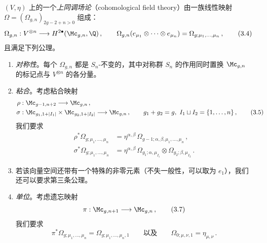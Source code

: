 \begin{definition}[3.1]
$(V,\eta)$ 上的一个\emph{上同调场论}（cohomological field theory）由一族线性映射 $\Omega=(\Omega_{g,n})_{2g-2+n>0}$ 组成：
\begin{equation}
  \Omega_{g,n}:V^{\otimes n}\longrightarrow H^{2\bullet}(\Mc_{g,n},\Q)\,,\qquad
  \Omega_{g,n}(e_{\mu_{1}}\otimes\cdots\otimes e_{\mu_{n}})=\Omega_{g;\mu_{1},\dots,\mu_{n}}\,,
  \tag{3.4}
\end{equation}
且满足下列公理。
\begin{enumerate}[label=\roman*)]
  \item \emph{对称性}。每个 $\Omega_{g,n}$ 都是 $S_{n}$-不变的，其中对称群 $S_{n}$ 的作用同时置换 $\Mc_{g,n}$ 的标记点与 $V^{\otimes n}$ 的各分量。
  \item \emph{粘合}。考虑粘合映射
  \begin{align}
    \rho &:\Mc_{g-1,n+2}\longrightarrow\Mc_{g,n}\,, \nonumber\\
    \sigma &:\Mc_{g_{1},1+|I_{1}|}\times\Mc_{g_{2},1+|I_{2}|}\longrightarrow\Mc_{g,n}\,,\qquad g_{1}+g_{2}=g,\ I_{1}\sqcup I_{2}=\{1,\dots,n\}\,,
    \tag{3.5}
  \end{align}
  我们要求
  \begin{align}
    \rho^{*}\Omega_{g;\mu_{1},\dots,\mu_{n}} &= \eta^{\alpha,\beta}\,\Omega_{g-1;\alpha,\beta,\mu_{1},\dots,\mu_{n}}\,, \nonumber\\
    \sigma^{*}\Omega_{g;\mu_{1},\dots,\mu_{n}} &= \eta^{\alpha,\beta}\,\Omega_{g_{1};\alpha,\mu_{I_{1}}}\otimes\Omega_{g_{2};\beta,\mu_{I_{2}}}\,.
    \tag{3.6}
  \end{align}
  \item[] 若该向量空间还带有一个特殊的非零元素（不失一般性，可以取为 $e_{1}$），我们还可以要求第三条公理。
  \item \emph{单位}。考虑遗忘映射
  \begin{equation}
    \pi:\Mc_{g,n+1}\longrightarrow\Mc_{g,n}\,,
    \tag{3.7}
  \end{equation}
  我们要求
  \begin{equation}
    \pi^{*}\Omega_{g;\mu_{1},\dots,\mu_{n}}=\Omega_{g;\mu_{1},\dots,\mu_{n},1}
    \qquad\mbox{以及}\qquad
    \Omega_{0;\mu,\nu,1}=\eta_{\mu,\nu}\,.
    \tag{3.8}
  \end{equation}
\end{enumerate}
\end{definition}


